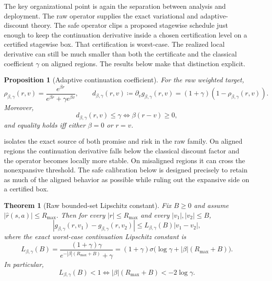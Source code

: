 \documentclass{article}
\newtheorem{theorem}{Theorem}[section]
\newtheorem{proposition}[proposition]{Proposition}
\theoremstyle{remark}
\newcommand{\defeq}{\coloneqq}
\newcommand{\gbg}{g_{\beta,\gamma}}
\newcommand{\bgL}[1]{L_{\beta,\gamma}(#1)}
\begin{document}
The key organizational point is again the separation between analysis and deployment. The raw operator supplies the exact variational and adaptive-discount theory. The safe operator clips a proposed stagewise schedule just enough to keep the continuation derivative inside a chosen certification level on a certified stagewise box. That certification is worst-case. The realized local derivative can still be much smaller than both the certificate and the classical coefficient $\gamma$ on aligned regions. The results below make that distinction explicit.

\begin{proposition}[Adaptive continuation coefficient]
\label{prop:effective-discount}
For the raw weighted target,
\[
\rho_{\beta,\gamma}(r,v)=\frac{e^{\beta r}}{e^{\beta r}+\gamma e^{\beta v}},
\qquad
d_{\beta,\gamma}(r,v) \defeq \partial_v \gbg(r,v) = (1+\gamma)(1-\rho_{\beta,\gamma}(r,v)).
\]
Moreover,
\begin{equation}
d_{\beta,\gamma}(r,v) \le \gamma
\iff
\beta(r-v)\ge 0,
\label{eq:discount-comparison}
\end{equation}
and equality holds iff either $\beta=0$ or $r=v$.
\end{proposition}

 isolates the exact source of both promise and risk in the raw family.
On aligned regions the continuation derivative falls below the classical discount factor and the operator becomes locally more stable.
On misaligned regions it can cross the nonexpansive threshold.
The safe calibration below is designed precisely to retain as much of the aligned behavior as possible while ruling out the expansive side on a certified box.


\begin{theorem}[Raw bounded-set Lipschitz constant]
\label{thm:lse-contraction}
Fix $B\ge 0$ and assume $|\hat r(s,a)|\le R_{\max}$.
Then for every $|r|\le R_{\max}$ and every $|v_1|,|v_2|\le B$,
\begin{equation}
|\gbg(r,v_1)-\gbg(r,v_2)| \le \bgL{B}|v_1-v_2|,
\label{eq:raw-lipschitz}
\end{equation}
where the exact worst-case continuation Lipschitz constant is
\begin{equation}
\bgL{B}
=
\frac{(1+\gamma)\gamma}{e^{-|\beta|(R_{\max}+B)}+\gamma}
=
(1+\gamma)\sigma\!\bigl(\log\gamma + |\beta|(R_{\max}+B)\bigr).
\label{eq:contraction-bound}
\end{equation}
In particular,
\begin{equation}
\bgL{B}<1
\iff
|\beta|(R_{\max}+B)<-2\log\gamma.
\label{eq:expansive-threshold}
\end{equation}
\end{theorem}
\end{document}
